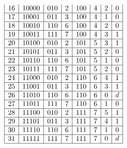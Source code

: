 \documentclass{article}
\begin{document}
\begin{enumerate}
$$\begin{array}{|c|c|c|c|c|c|c|c|c|c|c|}
                           16 & 10000           & 010     & 2              & 100       & 4                & 2                       & 0 \\\hline
                           17 & 10001           & 011     & 3              & 100       & 4                & 1                       & 0 \\\hline
                           18 & 10010           & 110     & 6              & 100       & 4                & 2                       & 0 \\\hline
                           19 & 10011           & 111     & 7              & 100       & 4                & 3                       & 1 \\\hline
                           20 & 10100           & 010     & 2              & 101       & 5                & 3                       & 1 \\\hline
                           21 & 10101           & 011     & 3              & 101       & 5                & 2                       & 0 \\\hline
                           22 & 10110           & 110     & 6              & 101       & 5                & 1                       & 0 \\\hline
                           23 & 10111           & 111     & 7              & 101       & 5                & 2                       & 0 \\\hline
                           24 & 11000           & 010     & 2              & 110       & 6                & 4                       & 1 \\\hline
                           25 & 11001           & 011     & 3              & 110       & 6                & 3                       & 1 \\\hline
                           26 & 11010           & 110     & 6              & 110       & 6                & 0                       & d \\\hline
                           27 & 11011           & 111     & 7              & 110       & 6                & 1                       & 0 \\\hline
                           28 & 11100           & 010     & 2              & 111       & 7                & 5                       & 1 \\\hline
                           29 & 11101           & 011     & 3              & 111       & 7                & 4                       & 1 \\\hline
                           30 & 11110           & 110     & 6              & 111       & 7                & 1                       & 0 \\\hline
                           31 & 11111           & 111     & 7              & 111       & 7                & 0                       & d \\\hline
                    \end{array}$$
             

\end{enumerate}
\end{document}
